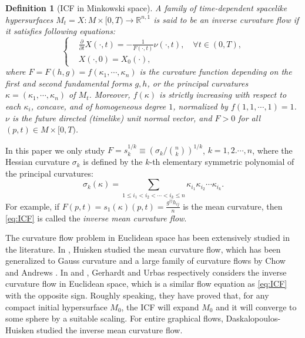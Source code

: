 \documentclass[10pt,a4paper]{amsart}
\newtheorem{remark}[theorem]{Remark}
\newcommand{\R}{\ensuremath{\mathbb{R}}}
\newcommand{\pd}[2]{\frac{\partial {#1}}{\partial {#2}}}
\newtheorem{definition}[theorem]{Definition}
\numberwithin{equation}{section}
\begin{document}
\begin{definition}[ICF in Minkowski space]
    A family of time-dependent spacelike hypersurfaces \(M_t = X:M\times [0,T) \to \R^{n,1}\) is said to be an inverse curvature flow if it satisfies following equations:
    \begin{equation}\label{eq:ICF}
        \left\{
        \begin{aligned}
        &\pd{}{t}X(\cdot,t) = -\frac{1}{F(\cdot,t)}\nu(\cdot,t),\quad \forall t\in (0,T), \\
        &X(\cdot,0)=X_0(\cdot), 
        \end{aligned}
        \right.
    \end{equation}
    where \(F = F(h,g) = f(\kappa_1,\cdots,\kappa_n)\) is  the curvature function depending on the first and second fundamental forms $g,h$, or the principal curvatures $\kappa=(\kappa_1,\cdots,\kappa_n)$ of $M_t$.  
 Moreover, $f(\kappa)$ is strictly increasing with respect to each \(\kappa_i\), concave, and of homogeneous degree \(1\), normalized by \(f(1,1,\cdots,1) = 1\). \(\nu\) is the future directed (timelike) unit normal vector, and \(F > 0\) for all \((p,t)\in M\times [0,T)\). 
\end{definition}
In this paper we only study \(F = s_k^{1/k}\equiv (\sigma_k / \binom{n}{k})^{1/k}\), \(k=1,2.\cdots,n\), where the Hessian curvature $\sigma_{k}$ is defined by the $k$-th  elementary symmetric polynomial of the principal curvatures:
\begin{equation*}
	\sigma_{k}(\kappa)=\sum_{1\leq i_{1}< i_{2}<\cdots< i_{k}\leq n}\kappa_{i_{1}}\kappa_{i_{2}}\cdots\kappa_{i_{k}}.
\end{equation*}
For example, if \(F(p,t) = s_1(\kappa)(p,t) = \frac{g^{ij}h_{ij}}{n}\) is the mean curvature, then \eqref{eq:ICF} is called the \textit{inverse mean curvature flow}.


The curvature flow problem in Euclidean space has been extensively studied in the literature. In \cite{Hui}, Huisken studied the mean curvature flow, which has been generalized to Gauss curvature and a large family of curvature flows by Chow \cite{Chow} and Andrews \cite{Pinching-estimates}.  In \cite{Ger} and \cite{Ur}, Gerhardt and Urbas respectively considers the inverse curvature flow in Euclidean space, which is a similar flow equation as \eqref{eq:ICF} with the opposite sign. Roughly speaking, they have proved that, for any compact initial hypersurface $M_0$, the ICF will expand $M_0$ and it will converge to some sphere by a suitable scaling. For entire graphical flows,  Daskalopoulos-Huisken \cite{DH} studied the inverse mean curvature flow. 
\end{document}
